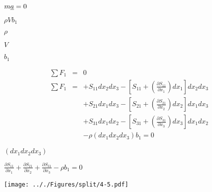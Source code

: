 \documentclass[onecolumn,11pt]{report}
\def\lthtmlcheckvsize{\ifdim\ht\sizebox<\vsize 
  \ifdim\wd\sizebox<\hsize\expandafter\hfill\fi \expandafter\vfill
  \else\expandafter\vss\fi}%
\begin{document}
{\newpage\clearpage
{}%
$ m \uline{a} = 0$%
\lthtmlindisplaymathZ
\lthtmlcheckvsize\clearpage}

{\newpage\clearpage
{}%
$ \rho V b_1$%
\lthtmlindisplaymathZ
\lthtmlcheckvsize\clearpage}

{\newpage\clearpage
{}%
$ \rho$%
\lthtmlindisplaymathZ
\lthtmlcheckvsize\clearpage}

{\newpage\clearpage
{}%
$ V$%
\lthtmlindisplaymathZ
\lthtmlcheckvsize\clearpage}

{\newpage\clearpage
{}%
$ b_1$%
\lthtmlindisplaymathZ
\lthtmlcheckvsize\clearpage}

{\newpage\clearpage
{}%
\begin{displaymath}\begin{array}{rcl}
\sum F_1 & = & 0 \\
\sum F_1 & =
& + S_{11} dx_2 dx_3 - \left[ S_{11} + (\frac{\partial S_{11}}{\partial x_1}) dx_1 \right] dx_2 dx_3 \\
& & + S_{21} dx_1 dx_3 - \left[ S_{21} + (\frac{\partial S_{21}}{\partial x_2}) dx_2 \right] dx_1 dx_3 \\
& & + S_{31} dx_1 dx_2 - \left[ S_{31} + (\frac{\partial S_{31}}{\partial x_3}) dx_3 \right] dx_1 dx_2 \\
& & - \rho (dx_1 dx_2 dx_3) b_1 = 0
\end{array}\end{displaymath}%
\lthtmldisplayZ
\lthtmlcheckvsize\clearpage}

{\newpage\clearpage
{}%
$ (dx_1 dx_2 dx_3)$%
\lthtmlindisplaymathZ
\lthtmlcheckvsize\clearpage}

{\newpage\clearpage
{}%
$\displaystyle \frac{\partial S_{11}}{\partial x_1} +
\frac{\partial S_{21}}{\partial x_2} +
\frac{\partial S_{31}}{\partial x_3} -
\rho b_1 = 0$%
\lthtmlindisplaymathZ
\lthtmlcheckvsize\clearpage}

{\newpage\clearpage
{}%
\texttt{[image: .././Figures/split/4-5.pdf]}%
\lthtmlpictureZ
\lthtmlcheckvsize\clearpage}
\end{document}
